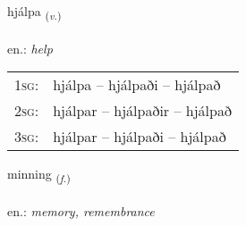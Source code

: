 \documentclass[frontgrid, backgrid]{flacards}\usepackage[]{graphicx}\usepackage[]{xcolor}
\begin{document}
\renewcommand{\blhead}{\vskip5pt {\small\bfseries\footnotesize Sagnorð | Verb }}
\renewcommand{\bcfoot}{\vskip5pt \hspace{2pt}{\small\bfseries\footnotesize 1K}}


{hjálpa \small{\textsubscript{(\textit{v.})}} \\[1ex] %
\textphonetic{[çaul̥pa]} \\
en.: \emph{help} \\  [2ex]
\renewcommand*{\arraystretch}{0.8}
\begin{tabular}{p{1cm}l}
\textsc{1sg}: & hjálpa -- hjálpaði -- hjálpað \\ 
\textsc{2sg}: & hjálpar -- hjálpaðir -- hjálpað \\ 
\textsc{3sg}: & hjálpar -- hjálpaði -- hjálpað \\ 
\end{tabular}
}

\renewcommand{\flhead}{\vskip5pt \fboxsep=0pt {\small\bfseries\footnotesize Nafnorð | Noun}}
\renewcommand{\fcfoot}{\vskip5pt \fboxsep=0pt \hspace{2pt}{\small\bfseries\footnotesize 1K}}

\renewcommand{\blhead}{\vskip5pt {\small\bfseries\footnotesize Nafnorð | Noun }}
\renewcommand{\bcfoot}{\vskip5pt \hspace{2pt}{\small\bfseries\footnotesize 1K}}


{minning \small{\textsubscript{(\textit{f.})}} \\[1ex] %
\textphonetic{[mɪniŋk]} \\
en.: \emph{memory, remembrance} \\  [2ex]
\renewcommand*{\arraystretch}{0.8}
}

\renewcommand{\flhead}{\vskip5pt \fboxsep=0pt {\small\bfseries\footnotesize Nafnorð | Noun}}
\renewcommand{\fcfoot}{\vskip5pt \fboxsep=0pt \hspace{2pt}{\small\bfseries\footnotesize 1K}}
\end{document}
